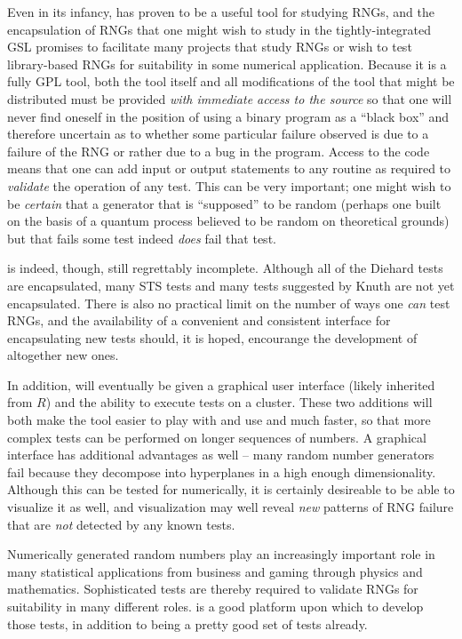 \documentclass{book}
\begin{document}
Even in its infancy, \die has proven to be a useful tool for studying
RNGs, and the encapsulation of RNGs that one might wish to study in the
tightly-integrated GSL promises to facilitate many projects that study
RNGs or wish to test library-based RNGs for suitability in some
numerical application.  Because it is a fully GPL tool, both the tool
itself and all modifications of the tool that might be distributed must
be provided {\em with immediate access to the source} so that one will
never find oneself in the position of using a binary program as a
``black box'' and therefore uncertain as to whether some particular
failure observed is due to a failure of the RNG or rather due to a bug
in the program.  Access to the code means that one can add input or
output statements to any routine as required to {\em validate} the
operation of any test.  This can be very important; one might wish to be
{\em certain} that a generator that is ``supposed'' to be random
(perhaps one built on the basis of a quantum process believed to be
random on theoretical grounds) but that fails some \die test indeed
{\em does} fail that test.

\die is indeed, though, still regrettably incomplete.  Although all of
the Diehard tests are encapsulated, many STS tests and many tests
suggested by Knuth are not yet encapsulated.  There is also no practical
limit on the number of ways one {\em can} test RNGs, and the
availability of a convenient and consistent interface for encapsulating
new tests should, it is hoped, encourange the development of altogether
new ones.

In addition, \die will eventually be given a graphical user interface
(likely inherited from $R$) and the ability to execute tests on a
cluster.  These two additions will both make the tool easier to play
with and use and much faster, so that more complex tests can be
performed on longer sequences of numbers.  A graphical interface has
additional advantages as well -- many random number generators fail
because they decompose into hyperplanes in a high enough dimensionality.
Although this can be tested for numerically, it is certainly desireable
to be able to visualize it as well, and visualization may well reveal
{\em new} patterns of RNG failure that are {\em not} detected by any
known tests.

Numerically generated random numbers play an increasingly important role
in many statistical applications from business and gaming through
physics and mathematics.  Sophisticated tests are thereby required to
validate RNGs for suitability in many different roles.  \die is a good
platform upon which to develop those tests, in addition to being a
pretty good set of tests already.


\end{document}
